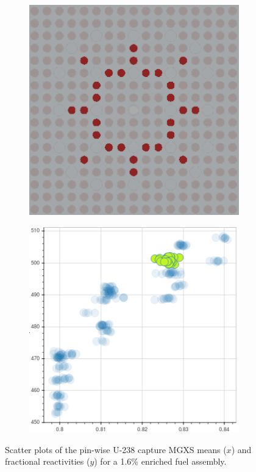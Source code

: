 \documentclass[12pt,twoside]{mitthesis-exec}
\begin{document}
\begin{figure}[h!]
\begin{subfigure}{0.45\textwidth}
  \caption{}
  \label{fig:chap10-capt-mean-pcm-mgxs-2}
\end{subfigure}
\begin{subfigure}{0.45\textwidth}
  \centering
  \includegraphics[width=0.9\linewidth]{figures/unsupervised/features/assm-16/u238-capt/mean-pcm/geometry-3}
  \caption{}
  \label{fig:chap10-capt-mean-pcm-geom-3}
\end{subfigure}%
\begin{subfigure}{0.45\textwidth}
  \centering
  \includegraphics[width=0.9\linewidth]{figures/unsupervised/features/assm-16/u238-capt/mean-pcm/mgxs-3}
  \caption{}
  \label{fig:chap10-capt-mean-pcm-mgxs-3}
\end{subfigure}
\caption[Clustering of U-238 capture MGXS fractional reactivities]{Scatter plots of the pin-wise U-238 capture MGXS means ($x$) and fractional reactivities ($y$) for a 1.6\% enriched fuel assembly.}
\label{fig:capt-mean-std}
\end{figure}
\end{document}
